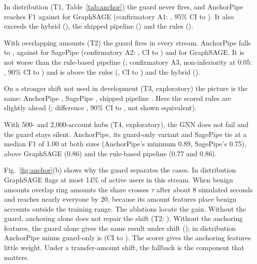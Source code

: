 In distribution (T1, Table~\ref{tab:anchor}) the guard never fires, and AnchorPipe
reaches F1 \AnTOneanchorF{} against \AnTOnegnnunscoredF{} for GraphSAGE
(confirmatory A1: \AnTOneVsgnnunscoredD{}, 95\% CI \AnTOneVsgnnunscoredLo{} to
\AnTOneVsgnnunscoredHi{}). It also exceeds the hybrid (\AnTOneVshybridD{}), the
shipped pipeline (\AnTOneVsproposedD{}) and the rules (\AnTOneVsrulesD{}).

With overlapping amounts (T2) the guard fires in every stream. AnchorPipe falls
to \AnTTwoanchorF{}, against \AnTTwosagepipeF{} for SagePipe (confirmatory A2:
\AnTTwoVssagepipeD{}, CI \AnTTwoVssagepipeLo{} to \AnTTwoVssagepipeHi{}) and
\AnTTwognnunscoredF{} for GraphSAGE. It is not worse than the rule-based
pipeline (\AnTTwoproposedF{}; confirmatory A3, non-inferiority at 0.05:
\AnTTwoVsproposedD{}, 90\% CI \AnTTwoVsproposedLoNinety{} to
\AnTTwoVsproposedHiNinety{}) and is above the rules (\AnTTwoVsrulesD{}, CI
\AnTTwoVsrulesLo{} to \AnTTwoVsrulesHi{}) and the hybrid (\AnTTwohybridF{}).

On a stronger shift not used in development (T3, exploratory) the picture is the
same: AnchorPipe \AnTThreeanchorF{}, SagePipe \AnTThreesagepipeF{}, shipped
pipeline \AnTThreeproposedF{}. Here the scored rules are slightly ahead
(\AnTThreerulesF{}; difference \AnTThreeVsrulesD{}, 90\% CI
\AnTThreeVsrulesLoNinety{} to \AnTThreeVsrulesHiNinety{}, not shown equivalent).

With 500- and 2{,}000-account hubs (T4, exploratory), the GNN does not fail and the
guard stays silent. AnchorPipe, its guard-only variant and SagePipe tie at a
median F1 of 1.00 at both sizes (AnchorPipe's minimum 0.89, SagePipe's 0.75), above
GraphSAGE (0.86) and the rule-based pipeline (0.77 and 0.86).

Fig.~\ref{fig:anchor}(b) shows why the guard separates the cases. In
distribution GraphSAGE flags at most 14\% of active users in this stream. When benign
amounts overlap ring amounts the share crosses $\tau$ after about 8 simulated
seconds and reaches nearly everyone by 20, because its amount features place benign accounts outside the training
range. The ablations locate the gain. Without the guard, anchoring alone does not
repair the shift (T2: \AnTTwoanchoronlyF{}). Without the anchoring features, the
guard alone gives the same result under shift (\AnTTwoguardonlyF{}); in
distribution AnchorPipe minus guard-only is \AnTOneVsguardonlyD{} (CI
\AnTOneVsguardonlyLo{} to \AnTOneVsguardonlyHi{}). The scorer gives the anchoring features little weight. Under a transfer-amount
shift, the fallback is the component that matters.

